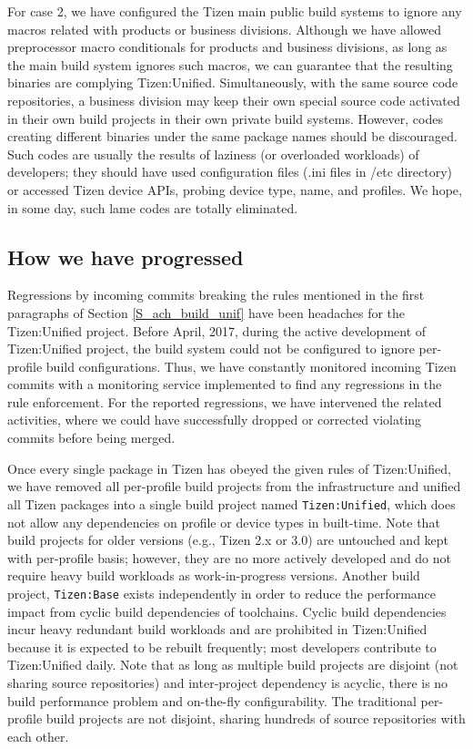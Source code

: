 For case 2, we have configured the Tizen main public build systems to ignore any macros related with products or business divisions.
Although we have allowed preprocessor macro conditionals for products and business divisions, as long as the main build system ignores such macros, we can guarantee that the resulting binaries are complying Tizen:Unified.
Simultaneously, with the same source code repositories, a business division may keep their own special source code activated in their own build projects in their own private build systems.
However, codes creating different binaries under the same package names should be discouraged.
Such codes are usually the results of laziness (or overloaded workloads) of developers; they should have used configuration files (.ini files in /etc directory) or accessed Tizen device APIs, probing device type, name, and profiles.
We hope, in some day, such lame codes are totally eliminated.


\subsection{How we have progressed}

Regressions by incoming commits breaking the rules mentioned in the first paragraphs of Section \ref{S_ach_build_unif} have been headaches for the Tizen:Unified project.
Before April, 2017, during the active development of Tizen:Unified project, the build system could not be configured to ignore per-profile build configurations.
Thus, we have constantly monitored incoming Tizen commits with a monitoring service implemented to find any regressions in the rule enforcement.
For the reported regressions, we have intervened the related activities, where we could have successfully dropped or corrected violating commits before being merged.


Once every single package in Tizen has obeyed the given rules of Tizen:Unified, we have removed all per-profile build projects from the infrastructure and unified all Tizen packages into a single build project named \texttt{Tizen:Unified}, which does not allow any dependencies on profile or device types in built-time.
Note that build projects for older versions (e.g., Tizen 2.x or 3.0) are untouched and kept with per-profile basis; however, they are no more actively developed and do not require heavy build workloads as work-in-progress versions.
Another build project, \texttt{Tizen:Base} exists independently in order to reduce the performance impact from cyclic build dependencies of toolchains.
Cyclic build dependencies incur heavy redundant build workloads and are prohibited in Tizen:Unified because it is expected to be rebuilt frequently; most developers contribute to Tizen:Unified daily.
Note that as long as multiple build projects are disjoint (not sharing source repositories) and inter-project dependency is acyclic, there is no build performance problem and on-the-fly configurability.
The traditional per-profile build projects are not disjoint, sharing hundreds of source repositories with each other.


